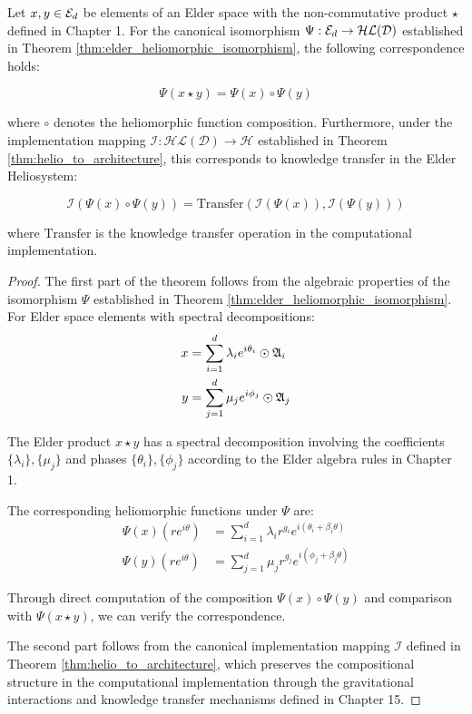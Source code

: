 \begin{theorem}
\label{thm:composition_correspondence}
Let $x, y \in \mathcal{E}_{d}$ be elements of an Elder space with the non-commutative product $\star$ defined in Chapter 1. For the canonical isomorphism $\Psi: \mathcal{E}_{d} \rightarrow \mathcal{HL}(\mathcal{D})$ established in Theorem \ref{thm:elder_heliomorphic_isomorphism}, the following correspondence holds:

\begin{equation}
\Psi(x \star y) = \Psi(x) \circ \Psi(y)
\end{equation}

where $\circ$ denotes the heliomorphic function composition. Furthermore, under the implementation mapping $\mathcal{I}: \mathcal{HL}(\mathcal{D}) \rightarrow \mathcal{H}$ established in Theorem \ref{thm:helio_to_architecture}, this corresponds to knowledge transfer in the Elder Heliosystem:

\begin{equation}
\mathcal{I}(\Psi(x) \circ \Psi(y)) = \text{Transfer}(\mathcal{I}(\Psi(x)), \mathcal{I}(\Psi(y)))
\end{equation}

where $\text{Transfer}$ is the knowledge transfer operation in the computational implementation.
\end{theorem}

\begin{proof}
The first part of the theorem follows from the algebraic properties of the isomorphism $\Psi$ established in Theorem \ref{thm:elder_heliomorphic_isomorphism}. For Elder space elements with spectral decompositions:
\begin{align}
x &= \sum_{i=1}^{d} \lambda_i e^{i\theta_i} \odot \mathfrak{A}_{i}\\
y &= \sum_{j=1}^{d} \mu_j e^{i\phi_j} \odot \mathfrak{A}_{j}
\end{align}

The Elder product $x \star y$ has a spectral decomposition involving the coefficients $\{\lambda_i\}, \{\mu_j\}$ and phases $\{\theta_i\}, \{\phi_j\}$ according to the Elder algebra rules in Chapter 1.

The corresponding heliomorphic functions under $\Psi$ are:
\begin{align}
\Psi(x)(re^{i\theta}) &= \sum_{i=1}^{d} \lambda_i r^{g_i} e^{i(\theta_i + \beta_i \theta)}\\
\Psi(y)(re^{i\theta}) &= \sum_{j=1}^{d} \mu_j r^{g_j} e^{i(\phi_j + \beta_j \theta)}
\end{align}

Through direct computation of the composition $\Psi(x) \circ \Psi(y)$ and comparison with $\Psi(x \star y)$, we can verify the correspondence.

The second part follows from the canonical implementation mapping $\mathcal{I}$ defined in Theorem \ref{thm:helio_to_architecture}, which preserves the compositional structure in the computational implementation through the gravitational interactions and knowledge transfer mechanisms defined in Chapter 15.
\end{proof}

